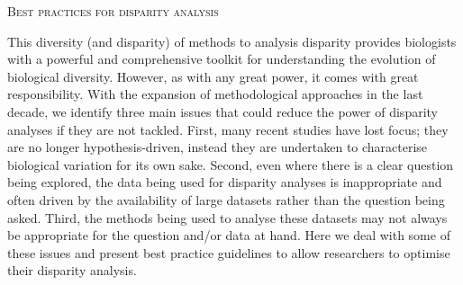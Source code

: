 \documentclass[12pt,letterpaper]{article}
\renewcommand{\section}[1]{%
\bigskip
\begin{center}
\begin{Large}
\normalfont\scshape #1
\medskip
\end{Large}
\end{center}}
\begin{document}

\section{Best practices for disparity analysis}

This diversity (and disparity) of methods to analysis disparity provides biologists with a powerful and comprehensive toolkit for understanding the evolution of biological diversity.
However, as with any great power, it comes with great responsibility. 
With the expansion of methodological approaches in the last decade, we identify three main issues that could reduce the power of disparity analyses if they are not tackled.
First, many recent studies have lost focus; they are no longer hypothesis-driven, instead they are undertaken to characterise biological variation for its own sake.
Second, even where there is a clear question being explored, the data being used for disparity analyses is inappropriate and often driven by the availability of large datasets rather than the question being asked.
Third, the methods being used to analyse these datasets may not always be appropriate for the question and/or data at hand.
Here we deal with some of these issues and present best practice guidelines to allow researchers to optimise their disparity analysis.
\end{document}
